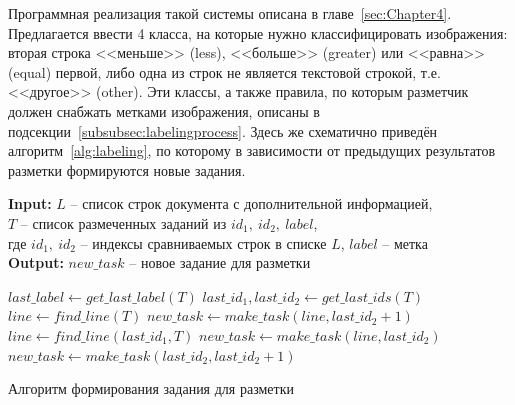 Программная реализация такой системы описана в главе~\ref{sec:Chapter4}.
Предлагается ввести 4 класса, на которые нужно классифицировать изображения: вторая строка <<меньше>> (less), <<больше>> (greater) или <<равна>> (equal) первой, либо одна из строк не является текстовой строкой, т.е. <<другое>> (other).
Эти классы, а также правила, по которым разметчик должен снабжать метками изображения, описаны в подсекции~\ref{subsubsec:labelingprocess}.
Здесь же схематично приведён алгоритм~\ref{alg:labeling}, по которому в зависимости от предыдущих результатов разметки формируются новые задания.

\begin{algorithm}[h]
    \hspace*{\algorithmicindent} \textbf{Input:} $L$ -- список строк документа с дополнительной информацией, \\
    \hspace*{\algorithmicindent} $T$ -- список размеченных заданий из $id_1,~id_2,~label$, \\
    \hspace*{\algorithmicindent} где $id_1,~id_2$ -- индексы сравниваемых строк в списке $L$, $label$ -- метка \\
    \hspace*{\algorithmicindent} \textbf{Output:} $new\_task$ -- новое задание для разметки
    \begin{algorithmic}
        \State $last\_label \gets get\_last\_label(T)$ 
        \State $last\_id_1, last\_id_2 \gets get\_last\_ids(T)$ 
            \State $line \gets find\_line(T)$ 
            \State $new\_task \gets make\_task(line, last\_id_2 + 1)$ 
            \State $line \gets find\_line(last\_id_1, T)$ 
            \State $new\_task \gets make\_task(line, last\_id_2)$ 
        \Else {}
            \State $new\_task \gets make\_task(last\_id_2, last\_id_2 + 1)$ 
    \end{algorithmic}
    \caption{Алгоритм формирования задания для разметки}
    \label{alg:labeling}
\end{algorithm}



